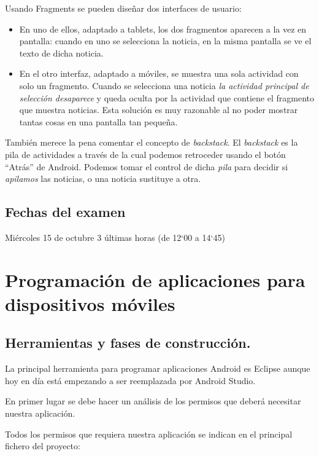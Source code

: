 \documentclass[a4paper,12pt,spanish]{sphinxmanual}
\begin{document}
Usando Fragments se pueden diseñar dos interfaces de usuario:
\begin{itemize}
\item {} 
En uno de ellos, adaptado a tablets, los dos fragmentos aparecen a la vez en pantalla: cuando en uno se selecciona la noticia, en la misma pantalla se ve el texto de dicha noticia.

\item {} 
En el otro interfaz, adaptado a móviles, se muestra una sola actividad con solo un fragmento. Cuando se selecciona una noticia \emph{la actividad principal de selección desaparece} y queda oculta por la actividad que contiene el fragmento que muestra noticias. Esta solución es muy razonable al no poder mostrar tantas cosas en una pantalla tan pequeña.

\end{itemize}

También merece la pena comentar el concepto de \emph{backstack}. El \emph{backstack} es la pila de actividades a través de la cual podemos retroceder usando el botón ``Atrás'' de Android. Podemos tomar el control de dicha \emph{pila} para decidir si \emph{apilamos} las noticias, o una noticia sustituye a otra.


\section{Fechas del examen}
\label{tema1:fechas-del-examen}
Miércoles 15 de octubre 3 últimas horas (de 12`00 a 14`45)


\chapter{Programación de aplicaciones para dispositivos móviles}
\label{tema2:programacion-de-aplicaciones-para-dispositivos-moviles}\label{tema2::doc}

\section{Herramientas y fases de construcción.}
\label{tema2:herramientas-y-fases-de-construccion}
La principal herramienta para programar aplicaciones Android es Eclipse aunque hoy en día está empezando a ser reemplazada por Android Studio.

En primer lugar se debe hacer un análisis de los permisos que deberá necesitar nuestra aplicación.

Todos los permisos que requiera nuestra aplicación se indican en el principal fichero del proyecto: 
\end{document}

